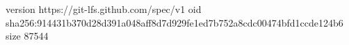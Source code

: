 version https://git-lfs.github.com/spec/v1
oid sha256:914431b370d28d391a048aff8d7d929fe1ed7b752a8cdc00474bfd1ccde124b6
size 87544
